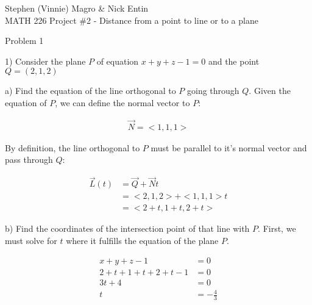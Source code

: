 \documentclass{article}
\begin{document}
\begin{text}
Stephen (Vinnie) Magro \& Nick Entin \\
\indent MATH 226 Project \#2 - Distance from a point to line or to a plane \\
\newline
\newline
\end{text}
\begin{text}
\indent Problem 1 \\
\end{text}

\begin{text}
1) Consider the plane $P$ of equation $x + y + z - 1 = 0$ and the point $Q = (2, 1, 2)$
\newline
\end{text}

\begin{text}
\indent a) Find the equation of the line orthogonal to $P$ going through $Q$.
\newline\newline
\indent\indent\indent Given the equation of $P$, we can define the normal vector to $P$:
\end{text}

\begin{align*}
\vec{N}=<1,1,1>
\end{align*}

\begin{text}
\indent\indent By definition, the line orthogonal to $P$ must be parallel to it's normal vector and pass through $Q$:
\end{text}

\begin{align*}
\vec{L}(t) &= \vec{Q} + \vec{N}t \\
           &= < 2, 1, 2 > + < 1, 1, 1 >t \\
           &= < 2 + t, 1 + t, 2 + t >
\end{align*}

\begin{text}
\indent b) Find the coordinates of the intersection point of that line with $P$.
\newline\newline
\indent\indent\indent First, we must solve for $t$ where it fulfills the equation of the plane $P$.
\end{text}

\begin{align*}
x + y + z - 1 &= 0 \\
2 + t + 1 + t + 2 + t -1 &= 0 \\
3t + 4 &= 0 \\
t &= -\frac{4}{3}
\end {align*}
\end{document}
